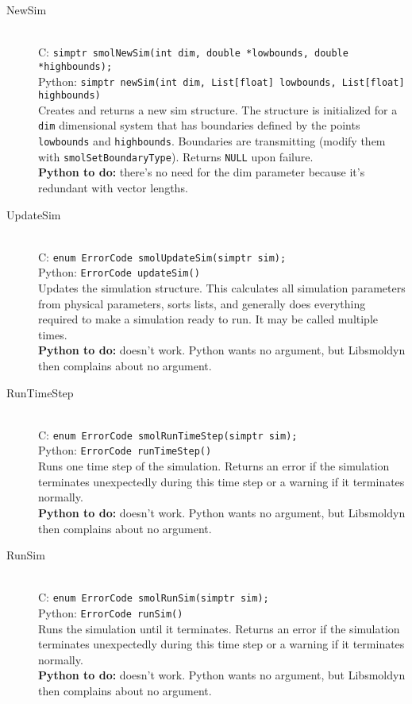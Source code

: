 \documentclass {book}
\begin{document}
\begin{description}

\item[NewSim]
\hfill \\
C: \texttt{simptr smolNewSim(int dim, double *lowbounds, double *highbounds);}\\
Python: \texttt{simptr newSim(int dim, List[float] lowbounds, List[float] highbounds)}\\
Creates and returns a new sim structure. The structure is initialized for a \texttt{dim} dimensional system that has boundaries defined by the points \texttt{lowbounds} and \texttt{highbounds}. Boundaries are transmitting (modify them with \texttt{smolSetBoundaryType}). Returns \texttt{NULL} upon failure.\\
\textbf{Python to do:} there's no need for the dim parameter because it's redundant with vector lengths.

\item[UpdateSim]
\hfill \\
C: \texttt{enum ErrorCode smolUpdateSim(simptr sim);}\\
Python: \texttt{ErrorCode updateSim()}\\
Updates the simulation structure. This calculates all simulation parameters from physical parameters, sorts lists, and generally does everything required to make a simulation ready to run. It may be called multiple times.\\
\textbf{Python to do:} doesn't work. Python wants no argument, but Libsmoldyn then complains about no argument.

\item[RunTimeStep]
\hfill \\
C: \texttt{enum ErrorCode smolRunTimeStep(simptr sim);}\\
Python: \texttt{ErrorCode runTimeStep()}\\
Runs one time step of the simulation. Returns an error if the simulation terminates unexpectedly during this time step or a warning if it terminates normally.\\
\textbf{Python to do:} doesn't work. Python wants no argument, but Libsmoldyn then complains about no argument.

\item[RunSim]
\hfill \\
C: \texttt{enum ErrorCode smolRunSim(simptr sim);}\\
Python: \texttt{ErrorCode runSim()}\\
Runs the simulation until it terminates. Returns an error if the simulation terminates unexpectedly during this time step or a warning if it terminates normally.\\
\textbf{Python to do:} doesn't work. Python wants no argument, but Libsmoldyn then complains about no argument.


\end{description}
\end{document}
